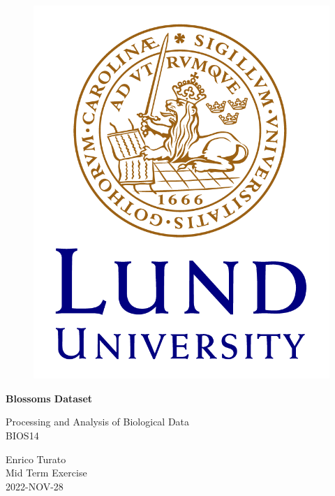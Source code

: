 \begin{titlepage}
    \begin{center}
        \begin{figure}[H]
            \centering
            \includegraphics[scale=0.3]{LundUniversity_C2line_RGB.png}
        \end{figure}
        
        \vspace*{1 cm}
        
        \Huge
        \textbf{Blossoms Dataset}
        
        \huge
        \vspace{0.4cm}
        Processing and Analysis of Biological Data\\
        BIOS14
        
        \LARGE
        \vspace{2cm}
        Enrico Turato\\
        
        \LARGE
        \vspace{2cm}
        Mid Term Exercise\\
        
        \Large
        \vspace{3 cm}
        2022-NOV-28
        
        \vspace{1cm}

    \end{center}
\end{titlepage}